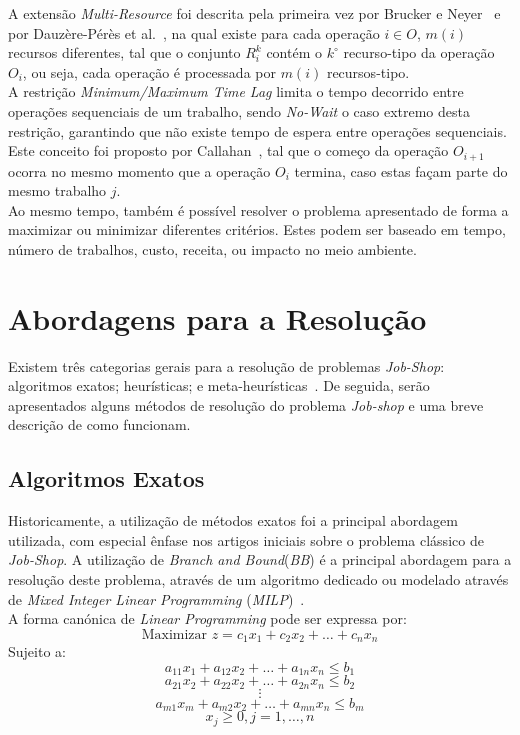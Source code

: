 A extensão \textit{Multi-Resource} foi descrita pela primeira vez por Brucker e Neyer~\cite{bruckerTabusearchMultimodeJobshop1998} e por Dauzère-Pérès et al.~\cite{dauzere-peresMultiresourceShopScheduling1998}, na qual existe para cada operação $i \in O$, $m(i)$ recursos diferentes, tal que o conjunto $R_{i}^{k}$ contém o $k^{\circ}$ recurso-tipo da operação $O_{i}$, ou seja, cada operação é processada por $m(i)$ recursos-tipo.\\

A restrição \textit{Minimum/Maximum Time Lag} limita o tempo decorrido entre operações sequenciais de um trabalho, sendo \textit{No-Wait} o caso extremo desta restrição, garantindo que não existe tempo de espera entre operações sequenciais. Este conceito foi proposto por Callahan~\cite{callahanNothingHotDelay1971}, tal que o começo da operação $O_{i+1}$ ocorra no mesmo momento que a operação $O_{i}$ termina, caso estas façam parte do mesmo trabalho $j$.\\

Ao mesmo tempo, também é possível resolver o problema apresentado de forma a maximizar ou minimizar diferentes critérios. Estes podem ser baseado em tempo, número de trabalhos, custo, receita, ou impacto no meio ambiente.\\

\section{Abordagens para a Resolução}
\label{sec:abordagens_para_a_resolução}

Existem três categorias gerais para a resolução de problemas \textit{Job-Shop}: algoritmos exatos; heurísticas; e meta-heurísticas~\cite{jiangReviewIntelligentScheduling2023}. De seguida, serão apresentados alguns métodos de resolução do problema \textit{Job-shop} e uma breve descrição de como funcionam.\\

\subsection{Algoritmos Exatos}

Historicamente, a utilização de métodos exatos foi a principal abordagem utilizada, com especial ênfase nos artigos iniciais sobre o problema clássico de \textit{Job-Shop}. A utilização de \textit{Branch and Bound}(\textit{BB}) é a principal abordagem para a resolução deste problema, através de um algoritmo dedicado ou modelado através de \textit{Mixed Integer Linear Programming} (\textit{MILP})~\cite{dauzere-peresFlexibleJobShop2024}.\\
A forma canónica de \textit{Linear Programming} pode ser expressa por:\\
$$\text{Maximizar } z =c_{1}x_{1} + c_{2}x_{2} + \ldots + c_{n}x_{n}$$
Sujeito a:
$$a_{11}x_{1} + a_{12}x_{2} + \ldots + a_{1n}x_{n} \leq b_{1}$$
$$a_{21}x_{2} + a_{22}x_{2} + \ldots + a_{2n}x_{n} \leq b_{2}$$
$$\vdots$$
$$a_{m1}x_{m} + a_{m2}x_{2} + \ldots + a_{mn}x_{n} \leq b_{m}$$
$$x_{j} \geq 0, j=1, \ldots, n$$

